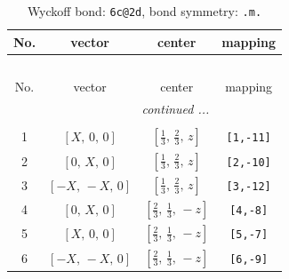 \documentclass[fleqn,8pt]{jsarticle}
\begin{document}
\renewcommand{\arraystretch}{1.2}
\begin{longtable}{cccc}
\caption{Wyckoff bond: {\tt 6c@2d}, bond symmetry: {\tt .m.}}
 \\
 \hline \hline
No. & vector & center & mapping \\ \hline \endfirsthead

\multicolumn{3}{l}{\tablename\ \thetable{}} \\
 \hline \hline
No. & vector & center & mapping \\ \hline \endhead

 \hline \hline
\multicolumn{3}{r}{\footnotesize\it continued ...} \\ \endfoot

 \hline \hline
\multicolumn{3}{r}{} \\ \endlastfoot

1 & $\left[ X,\, 0,\, 0 \right]$ & $\left[ \frac{1}{3},\, \frac{2}{3},\, z \right]$ & {\tt [1,-11]} \\ \hline
2 & $\left[ 0,\, X,\, 0 \right]$ & $\left[ \frac{1}{3},\, \frac{2}{3},\, z \right]$ & {\tt [2,-10]} \\ \hline
3 & $\left[ - X,\, - X,\, 0 \right]$ & $\left[ \frac{1}{3},\, \frac{2}{3},\, z \right]$ & {\tt [3,-12]} \\ \hline
4 & $\left[ 0,\, X,\, 0 \right]$ & $\left[ \frac{2}{3},\, \frac{1}{3},\, - z \right]$ & {\tt [4,-8]} \\ \hline
5 & $\left[ X,\, 0,\, 0 \right]$ & $\left[ \frac{2}{3},\, \frac{1}{3},\, - z \right]$ & {\tt [5,-7]} \\ \hline
6 & $\left[ - X,\, - X,\, 0 \right]$ & $\left[ \frac{2}{3},\, \frac{1}{3},\, - z \right]$ & {\tt [6,-9]} \\
\end{longtable}
\renewcommand{\arraystretch}{1.2}
\end{document}
